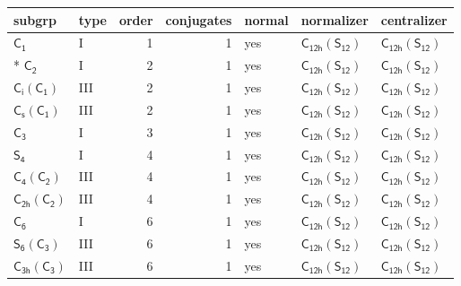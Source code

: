 \documentclass[10pt,a4paper]{article}
\numberwithin{equation}{section}
\newcommand{\grp}[1]{\mathsf{#1}}
\begin{document}
{\small\begin{longtable}{@{}llrrlll@{}}\toprule
subgrp & type & order & conjugates & normal & normalizer & centralizer\\\midrule\endhead
\bottomrule\endfoot\endlastfoot
\href{../../../rotation/data/pdf/C1.pdf}{$\grp{C_{1}}$} & I & 1 & 1 & yes & \href{C12h-S12.pdf}{$\grp{C_{12h}}(\grp{S_{12}})$} & \href{C12h-S12.pdf}{$\grp{C_{12h}}(\grp{S_{12}})$}\\*
\href{../../../rotation/data/pdf/C2.pdf}{$\grp{C_{2}}$} & I & 2 & 1 & yes & \href{C12h-S12.pdf}{$\grp{C_{12h}}(\grp{S_{12}})$} & \href{C12h-S12.pdf}{$\grp{C_{12h}}(\grp{S_{12}})$}\\
\href{S2-C1.pdf}{$\grp{C_{i}}(\grp{C_{1}})$} & III & 2 & 1 & yes & \href{C12h-S12.pdf}{$\grp{C_{12h}}(\grp{S_{12}})$} & \href{C12h-S12.pdf}{$\grp{C_{12h}}(\grp{S_{12}})$}\\
\href{C1v-C1.pdf}{$\grp{C_{s}}(\grp{C_{1}})$} & III & 2 & 1 & yes & \href{C12h-S12.pdf}{$\grp{C_{12h}}(\grp{S_{12}})$} & \href{C12h-S12.pdf}{$\grp{C_{12h}}(\grp{S_{12}})$}\\
\href{../../../rotation/data/pdf/C3.pdf}{$\grp{C_{3}}$} & I & 3 & 1 & yes & \href{C12h-S12.pdf}{$\grp{C_{12h}}(\grp{S_{12}})$} & \href{C12h-S12.pdf}{$\grp{C_{12h}}(\grp{S_{12}})$}\\
\href{../../../rotation/data/pdf/S4.pdf}{$\grp{S_{4}}$} & I & 4 & 1 & yes & \href{C12h-S12.pdf}{$\grp{C_{12h}}(\grp{S_{12}})$} & \href{C12h-S12.pdf}{$\grp{C_{12h}}(\grp{S_{12}})$}\\
\href{C4-C2.pdf}{$\grp{C_{4}}(\grp{C_{2}})$} & III & 4 & 1 & yes & \href{C12h-S12.pdf}{$\grp{C_{12h}}(\grp{S_{12}})$} & \href{C12h-S12.pdf}{$\grp{C_{12h}}(\grp{S_{12}})$}\\
\href{C2h-C2.pdf}{$\grp{C_{2h}}(\grp{C_{2}})$} & III & 4 & 1 & yes & \href{C12h-S12.pdf}{$\grp{C_{12h}}(\grp{S_{12}})$} & \href{C12h-S12.pdf}{$\grp{C_{12h}}(\grp{S_{12}})$}\\
\href{../../../rotation/data/pdf/C6.pdf}{$\grp{C_{6}}$} & I & 6 & 1 & yes & \href{C12h-S12.pdf}{$\grp{C_{12h}}(\grp{S_{12}})$} & \href{C12h-S12.pdf}{$\grp{C_{12h}}(\grp{S_{12}})$}\\
\href{S6-C3.pdf}{$\grp{S_{6}}(\grp{C_{3}})$} & III & 6 & 1 & yes & \href{C12h-S12.pdf}{$\grp{C_{12h}}(\grp{S_{12}})$} & \href{C12h-S12.pdf}{$\grp{C_{12h}}(\grp{S_{12}})$}\\
\href{C3h-C3.pdf}{$\grp{C_{3h}}(\grp{C_{3}})$} & III & 6 & 1 & yes & \href{C12h-S12.pdf}{$\grp{C_{12h}}(\grp{S_{12}})$} & \href{C12h-S12.pdf}{$\grp{C_{12h}}(\grp{S_{12}})$}\\

\end{longtable}}
\end{document}
